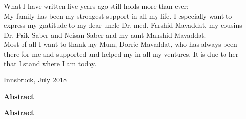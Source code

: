 \documentclass[a4paper,12pt,oneside,pointednumbers,bibtotoc,bigheadings,liststotoc]{scrbook}
\makeatletter
\newcommand\abstractname{Abstract}  %
\newenvironment{abstract}{%
      \titlepage
      \null\vfil
      \@beginparpenalty\@lowpenalty
      \begin{center}%
        \bfseries \abstractname
        \@endparpenalty\@M
      \end{center}}%
     {\par\vfil\null\endtitlepage}
\newenvironment{abstract}{%
      \if@twocolumn
        \section*{\abstractname}%
      \else
        \small
        \begin{center}%
          {\bfseries \abstractname\vspace{-.5em}\vspace{\z@}}%
        \end{center}%
        \quotation
      \fi}
      {\if@twocolumn\else\endquotation\fi}
\makeatother
\begin{document}
\newpage
\pagestyle{empty} %
What I have written five years ago still holds more than ever:\\
My family has been my strongest support in all my life. I especially want to express my gratitude to my dear uncle Dr. med. Farshid Mavaddat, my cousins Dr. Paik Saber and Neisan Saber and my aunt Mahshid Mavaddat.\\
Most of all I want to thank my Mum, Dorrie Mavaddat, who has always been there for me and supported and helped my in all my ventures. It is due to her that I stand where I am today.
    \begin{flushright}
         Innsbruck, July 2018\\
    \end{flushright}
\pagestyle{headings}


\thispagestyle{empty} 
\begin{abstract}
\blindtext
\end{abstract}

\begin{otherlanguage}{ngerman}
\begin{abstract}
\blindtext
\end{abstract}
\end{otherlanguage}


\restoregeometry

\thispagestyle{empty}
\pagestyle{fancy} %
\setcounter{page}{7} %
\tableofcontents
\newpage
\listoffigures

\newpage
\listoftables

\newpage

\end{document}
